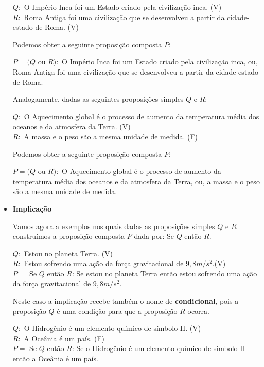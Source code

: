 \begin{itemize}
\begin{exem}
 $Q:$ O Império Inca foi um Estado criado pela civilização inca. (V) \\
 $R:$ Roma Antiga foi uma civilização que se desenvolveu a partir da cidade-estado de Roma. (V)
 
 Podemos obter a seguinte proposição composta $P$:
 
 $P= (Q$ ou $R):$ O Império Inca foi um Estado criado pela civilização inca, ou, Roma Antiga foi uma civilização que se desenvolveu a partir da cidade-estado de Roma.
 \end{exem}
  
 \begin{exem} \label{(Ou 3)}
 Analogamente, dadas as seguintes proposições simples $Q$ e $R$: 
 
 $Q:$ O Aquecimento global é o processo de aumento da temperatura média dos oceanos e da atmosfera da Terra. (V) \\
 $R:$ A massa e o peso são a mesma unidade de medida. (F)
 
 Podemos obter a seguinte proposição composta $P$:
 
 $P= (Q$ ou $R):$ O Aquecimento global é o processo de aumento da temperatura média dos oceanos e da atmosfera da Terra, ou, a massa e o peso são a mesma unidade de medida.  
 \end{exem}
 
 
 \item \textbf{Implicação}
 
 Vamos agora a exemplos nos quais dadas as proposições simples $Q$ e $R$ construímos a proposição composta $P$ dada por: Se $Q$ então $R$.
 
  \begin{exem} \label{(Se 1)}
 $Q:$ Estou no planeta Terra. (V) \\
 $R:$ Estou sofrendo uma ação da força gravitacional de $9,8 m/s^2$.(V) \\
 $P=$ Se $Q$ então $R$: Se estou no planeta Terra então estou sofrendo uma ação da força gravitacional de $9,8 m/s^2$.
 
 Neste caso a implicação recebe também o nome de \textbf{condicional}, pois a proposição $Q$ é uma condição para que a proposição $R$ ocorra.\end{exem}

 \begin{exem} \label{(Se 2)}
 $Q:$ O Hidrogênio é um elemento químico de símbolo H. (V) \\
 $R:$ A Oceânia é um país. (F) \\
 $P=$ Se $Q$ então $R$: Se o Hidrogênio é um elemento químico de símbolo H então a Oceânia é um país.
 \end{exem}


\end{itemize}
